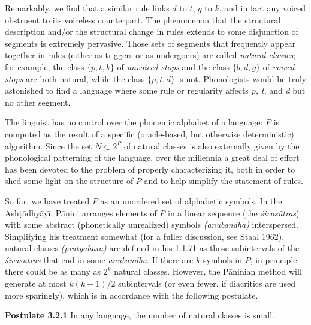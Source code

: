 Remarkably, we find that a similar rule links $d$ to $t$, $g$ to $k$, and in
fact any voiced obstruent to its voiceless counterpart.  The phenomenon that
the structural description and/or the structural change in rules extends to
some disjunction of segments is extremely pervasive. Those sets of segments
that frequently appear together in rules (either as triggers or as undergoers)
are called {\it natural classes}; for example,
the class $\{p, t, k\}$ of {\it unvoiced stops} and the class $\{b, d, g\}$ of
{\it voiced stops} are both natural, while the class $\{p, t, d\}$ is not.
Phonologists would be truly astonished to find a language where some rule or
regularity affects {\it p, t}, and {\it d} but no other segment. 

The linguist has no control over the phonemic alphabet of a language: $P$ is
computed as the result of a specific (oracle-based, but otherwise
deterministic) algorithm. Since the set $N \subset 2^P$ of natural classes is
also externally given by the phonological patterning of the language, over the
millennia a great deal of effort has been devoted to the problem of properly
characterizing it, both in order to shed some light on the structure of $P$
and to help simplify the statement of rules. 

So far, we have treated $P$ as an unordered set of alphabetic symbols. In the
Ash\d{t}\={a}\-dhy\={a}y\={\i}, P\={a}\d{n}ini arranges elements of $P$ in
a linear sequence (the {\it \'{s}ivas\={u}tras}) with
some abstract (phonetically unrealized) symbols {\it (anubandha)}
interspersed.  Simplifying his treatment somewhat (for a fuller discussion,
see \nocite{Staal:1962} Staal 1962), natural classes {\it
  (praty\={a}h\={a}ra)} are defined in his 1.1.71 as those subintervals of the
{\it \'{s}ivas\={u}tras} that end in some {\it anubandha}. If there are $k$
symbols in $P$, in principle there could be as many as $2^k$ natural
classes. However, the P\={a}\d{n}inian method will generate at most $k(k+1)/2$
subintervals (or even fewer, if diacritics are used more sparingly), which is
in accordance with the following postulate.
 

\smallskip\noindent
{\bf Postulate 3.2.1} In any language, the number of natural classes is small.

